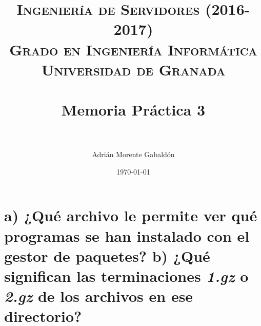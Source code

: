 


\title{
\normalfont \normalsize
\textsc{\textbf{Ingeniería de Servidores (2016-2017)} \\ Grado en Ingeniería Informática \\ Universidad de Granada} \\ [25pt] %
\horrule{0.5pt} \\[0.4cm] %
\huge Memoria Práctica 3 \\ %
\horrule{2pt} \\[0.5cm] %
}

\author{Adrián Morente Gabaldón} %

\date{\normalsize\today} %




\maketitle %

\newpage %

\tableofcontents %

\newpage

\listoffigures

\listoftables

\newpage


\section{a) ¿Qué archivo le permite ver qué programas se han instalado con el gestor de paquetes? b) ¿Qué significan las terminaciones \emph{1.gz} o \emph{2.gz} de los archivos en ese directorio?}

